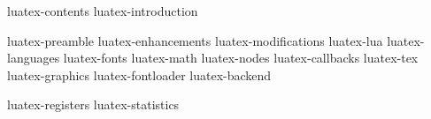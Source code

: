 \startfrontmatter
    \component luatex-contents
    \component luatex-introduction
\stopfrontmatter

\startbodymatter
    \component luatex-preamble
    \component luatex-enhancements
    \component luatex-modifications
    \component luatex-lua
    \component luatex-languages
    \component luatex-fonts
    \component luatex-math
    \component luatex-nodes
    \component luatex-callbacks
    \component luatex-tex
    \component luatex-graphics
    \component luatex-fontloader
    \component luatex-backend
\stopbodymatter

\startbackmatter
    \component luatex-registers
    \component luatex-statistics
\stopbackmatter

\stopdocument
